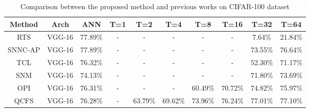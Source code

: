 \documentclass[letterpaper]{article} %
\begin{document}
\begin{table}[t]
    \caption{Comparison between the proposed method and previous works on CIFAR-100 dataset}
    \renewcommand\arraystretch{1.12}
	\centering
        \begin{threeparttable}
	\begin{tabular}{cccccccccc}\hline
	Method & Arch & ANN & T=1 & T=2 & T=4 & T=8 & T=16 & T=32 & T=64\\ \hline
	
	RTS                    & VGG-16 & 77.89\% & - & - & - & - & - & 7.64\% & 21.84\% \\\hline
	
	
	SNNC-AP                & VGG-16 & 77.89\% & - & - & - & - & - & 73.55\% & 76.64\% \\\hline
	TCL\tnote{*}                    & VGG-16 & 76.32\% & - & - & - & - & - & 52.30\% & 71.17\% \\\hline
	SNM                    & VGG-16 & 74.13\% & - & - & - & - & - & 71.80\% & 73.69\% \\\hline
	OPI                    & VGG-16 & 76.31\% & - & - & - & 60.49\% & 70.72\% & 74.82\% & 75.97\%  \\\hline
	QCFS                   & VGG-16 & 76.28\% & - & 63.79\% & 69.62\% & 73.96\% & 76.24\% & 77.01\% & 77.10\% \\\hline
	

\end{tabular}
\end{threeparttable}
\end{table}
\end{document}
